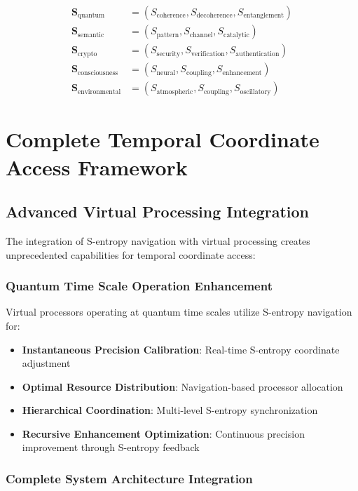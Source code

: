 \documentclass[12pt,a4paper]{article}
\begin{document}
{\begin{align}
\mathbf{S}_{\text{quantum}} &= (S_{\text{coherence}}, S_{\text{decoherence}}, S_{\text{entanglement}}) \\
\mathbf{S}_{\text{semantic}} &= (S_{\text{pattern}}, S_{\text{channel}}, S_{\text{catalytic}}) \\
\mathbf{S}_{\text{crypto}} &= (S_{\text{security}}, S_{\text{verification}}, S_{\text{authentication}}) \\
\mathbf{S}_{\text{consciousness}} &= (S_{\text{neural}}, S_{\text{coupling}}, S_{\text{enhancement}}) \\
\mathbf{S}_{\text{environmental}} &= (S_{\text{atmospheric}}, S_{\text{coupling}}, S_{\text{oscillatory}})
\end{align}

\section{Complete Temporal Coordinate Access Framework}

\subsection{Advanced Virtual Processing Integration}

The integration of S-entropy navigation with virtual processing creates unprecedented capabilities for temporal coordinate access:

\subsubsection{Quantum Time Scale Operation Enhancement}

Virtual processors operating at quantum time scales utilize S-entropy navigation for:

\begin{itemize}
\item \textbf{Instantaneous Precision Calibration}: Real-time S-entropy coordinate adjustment
\item \textbf{Optimal Resource Distribution}: Navigation-based processor allocation
\item \textbf{Hierarchical Coordination}: Multi-level S-entropy synchronization
\item \textbf{Recursive Enhancement Optimization}: Continuous precision improvement through S-entropy feedback
\end{itemize}

\subsubsection{Complete System Architecture Integration}

}
\end{document}
